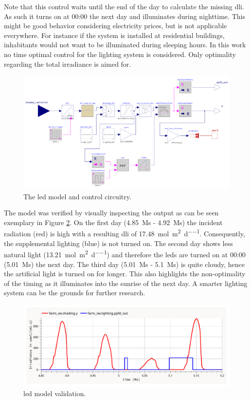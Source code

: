 Note that this control waits until the end of the day to calculate the missing \ac{dli}.
As such it turns on at 00:00 the next day and illuminates during nighttime.
This might be good behavior considering electricity prices, but is not applicable everywhere.
For instance if the system is installed at residential buildings, inhabitants would not want to be illuminated during sleeping hours.
In this work no time optimal control for the lighting system is considered.
Only optimality regarding the total irradiance is aimed for.

\begin{figure}[htbp]
  \centering
  \includegraphics[width=\textwidth]{img/simulation/led.pdf}
  \caption{The \ac{led} model and control circuitry.}
  \label{fig:led}
\end{figure}

The model was verified by visually inspecting the output as can be seen exemplary in Figure \ref{fig:led-validation}.
On the first day (\SI{4.85}{\mega\s} - \SI{4.92}{\mega\s}) the incident radiation (red) is high with a resulting \ac{dli} of \SI{17.48}{\mol\per\square\m\per\day}.
Consequently, the supplemental lighting (blue) is not turned on.
The second day shows less natural light (\SI{13.21}{\mol\per\square\m\per\day}) and therefore the \acp{led} are turned on at 00:00 (\SI{5.01}{\mega\s}) the next day.
The third day (\SI{5.01}{\mega\s} - \SI{5.1}{\mega\s}) is quite cloudy, hence the artificial light is turned on for longer.
This also highlights the non-optimality of the timing as it illuminates into the sunrise of the next day.
A smarter lighting system can be the grounds for further research.

\begin{figure}[htbp]
  \centering
  \includegraphics[width=\textwidth]{img/simulation/led-validation.pdf}
  \caption{\ac{led} model validation.}
  \label{fig:led-validation}
\end{figure}

